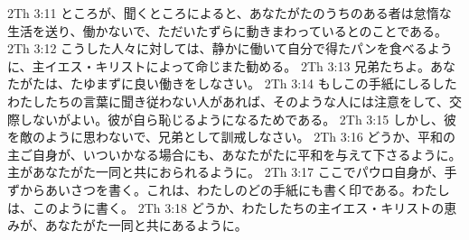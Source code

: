 2Th 3:11  ところが、聞くところによると、あなたがたのうちのある者は怠惰な生活を送り、働かないで、ただいたずらに動きまわっているとのことである。
2Th 3:12  こうした人々に対しては、静かに働いて自分で得たパンを食べるように、主イエス・キリストによって命じまた勧める。
2Th 3:13  兄弟たちよ。あなたがたは、たゆまずに良い働きをしなさい。
2Th 3:14  もしこの手紙にしるしたわたしたちの言葉に聞き従わない人があれば、そのような人には注意をして、交際しないがよい。彼が自ら恥じるようになるためである。
2Th 3:15  しかし、彼を敵のように思わないで、兄弟として訓戒しなさい。
2Th 3:16  どうか、平和の主ご自身が、いついかなる場合にも、あなたがたに平和を与えて下さるように。主があなたがた一同と共におられるように。
2Th 3:17  ここでパウロ自身が、手ずからあいさつを書く。これは、わたしのどの手紙にも書く印である。わたしは、このように書く。
2Th 3:18  どうか、わたしたちの主イエス・キリストの恵みが、あなたがた一同と共にあるように。


